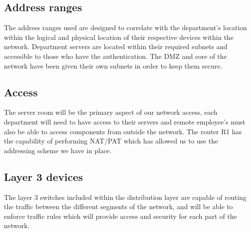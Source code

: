 \subsection{Address ranges}
The address ranges used are designed to correlate with the department's location within the logical and physical location of their respective devices within the network. Department servers are located within their required subnets and accessible to those who have the authentication. The DMZ and core of the network have been given their own subnets in order to keep them secure.
\subsection{Access}
The server room will be the primary aspect of our network access, each department will need to have access to their servers and remote employee's must also be able to access components from outside the network. The router R1 has the capability of performing NAT/PAT which has allowed us to use the addressing scheme we have in place.
\subsection{Layer 3 devices}
The layer 3 switches included within the distribution layer are capable of routing the traffic between the different segments of the network, and will be able to enforce traffic rules which will provide access and security for each part of the network.